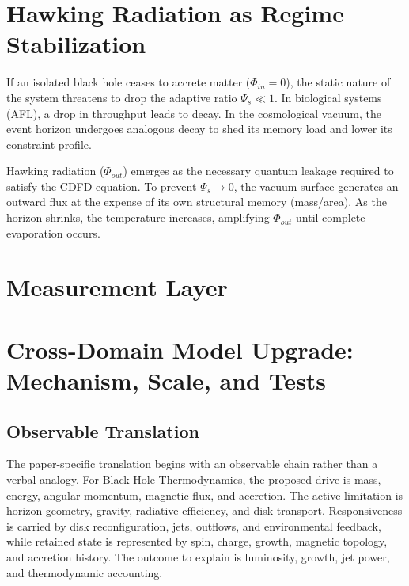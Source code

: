 \documentclass[11pt,a4paper]{article}
\begin{document}
\section{Hawking Radiation as Regime Stabilization}
If an isolated black hole ceases to accrete matter ($\Phi_{in} = 0$), the static nature of the system threatens to drop the adaptive ratio $\Psi_s \ll 1$. In biological systems (AFL), a drop in throughput leads to decay. In the cosmological vacuum, the event horizon undergoes analogous decay to shed its memory load and lower its constraint profile.

Hawking radiation ($\Phi_{out}$) emerges as the necessary quantum leakage required to satisfy the CDFD equation. To prevent $\Psi_s \to 0$, the vacuum surface generates an outward flux at the expense of its own structural memory (mass/area). As the horizon shrinks, the temperature increases, amplifying $\Phi_{out}$ until complete evaporation occurs.



\section{Measurement Layer}

\section{Cross-Domain Model Upgrade: Mechanism, Scale, and Tests}

\subsection{Observable Translation}

The paper-specific translation begins with an observable chain rather than a
verbal analogy. For Black Hole Thermodynamics, the proposed drive is mass, energy, angular momentum, magnetic flux, and accretion.
The active limitation is horizon geometry, gravity, radiative efficiency, and disk transport. Responsiveness is carried by
disk reconfiguration, jets, outflows, and environmental feedback, while retained state is represented by
spin, charge, growth, magnetic topology, and accretion history. The outcome to explain is luminosity, growth, jet power, and thermodynamic accounting.
\end{document}
